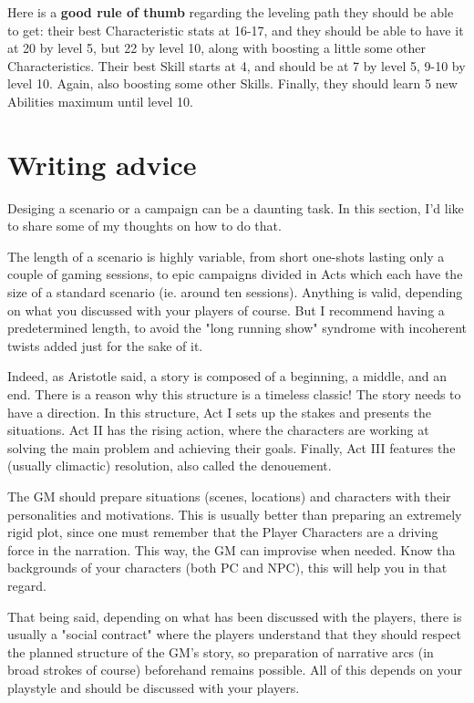 Here is a \textbf{good rule of thumb} regarding the leveling path they should be able to get: their best Characteristic stats at 16-17, and they should be able to have it at 20 by level 5, but 22 by level 10, along with boosting a little some other Characteristics. Their best Skill starts at 4, and should be at 7 by level 5, 9-10 by level 10. Again, also boosting some other Skills. Finally, they should learn 5 new Abilities maximum until level 10.



\section{Writing advice}

Desiging a scenario or a campaign can be a daunting task. In this section, I'd like to share some of my thoughts on how to do that.

The length of a scenario is highly variable, from short one-shots lasting only a couple of gaming sessions, to epic campaigns divided in Acts which each have the size of a standard scenario (ie. around ten sessions). Anything is valid, depending on what you discussed with your players of course. But I recommend having a predetermined length, to avoid the "long running show" syndrome with incoherent twists added just for the sake of it.

Indeed, as Aristotle said, a story is composed of a beginning, a middle, and an end. There is a reason why this structure is a timeless classic! The story needs to have a direction. In this structure, Act I sets up the stakes and presents the situations. Act II has the rising action, where the characters are working at solving the main problem and achieving their goals. Finally, Act III features the (usually climactic) resolution, also called the denouement. 

The GM should prepare situations (scenes, locations) and characters with their personalities and motivations. This is usually better than preparing an extremely rigid plot, since one must remember that the Player Characters are a driving force in the narration. This way, the GM can improvise when needed. Know tha backgrounds of your characters (both PC and NPC), this will help you in that regard.

That being said, depending on what has been discussed with the players, there is usually a "social contract" where the players understand that they should respect the planned structure of the GM's story, so preparation of narrative arcs (in broad strokes of course) beforehand remains possible. All of this depends on your playstyle and should be discussed with your players.


